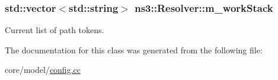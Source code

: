 \subsubsection[{\texorpdfstring{m\+\_\+work\+Stack}{m_workStack}}]{\setlength{\rightskip}{0pt plus 5cm}std\+::vector$<$std\+::string$>$ ns3\+::\+Resolver\+::m\+\_\+work\+Stack\hspace{0.3cm}{\ttfamily [private]}}\hypertarget{classns3_1_1Resolver_a7b3477fa2e0e29524a56740f1d13fe96}{}\label{classns3_1_1Resolver_a7b3477fa2e0e29524a56740f1d13fe96}
Current list of path tokens. 

The documentation for this class was generated from the following file\+:\begin{DoxyCompactItemize}
\item 
core/model/\hyperlink{config_8cc}{config.\+cc}\end{DoxyCompactItemize}
